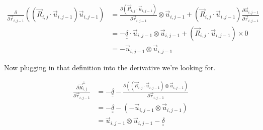 \documentclass{article}
\renewcommand{\ij}{_{i,j}}
\newcommand{\ijj}{_{i,j-1}}
\newcommand{\ijjj}{_{i,j-2}}
\newcommand{\magn}[1]{\left\vert #1 \right\vert }
\renewcommand{\part}[2]{\frac{\partial #1 }{\partial #2}}
\newcommand{\partbig}[2]{\frac{\partial }{\partial #2}\left( #1 \right)}
\newcommand{\ten}[1]{\underline{\underline{#1}}}
\newcommand{\rij}{\vec{r} \ij}
\newcommand{\Rij}{\vec{R} \ij}
\newcommand{\rijj}{\vec{r} \ijj}
\newcommand{\rijjj}{\vec{r} \ijjj}
\newcommand{\uijj}{\vec{u} \ijj}
\begin{document}
\begin{align*}
  \partbig{\left(\vec{R}\ij \cdot \vec{u} \ijj \right) 
  \vec{u} \ijj 
  }{\vec{r}\ijj}
  &= 
  \part{\left(\vec{R}\ij \cdot \vec{u} \ijj \right)}{\vec{r}\ijj} \otimes
  \uijj 
  +
  \left(\vec{R}\ij \cdot \vec{u} \ijj \right)
  \part{\uijj }{\vec{r}\ijj} 
  \\
  &= 
  - \ten{\delta} \cdot \uijj 
  \otimes \uijj 
  + \left(\Rij \cdot \uijj \right) \times 0
  \\
  &= 
  - \uijj \otimes \uijj
\end{align*}

Now plugging in that definition into the derivative we're looking for.

\begin{align*}
  \part{\vec{R}\ij ^ \bot}{\vec{r}\ijj}  &= - \ten{\delta} 
  - \part{\left(\left(\vec{R}\ij \cdot \uijj \right) \otimes 
  \vec{u} \ijj \right)
  }{\vec{r}\ijj} 
  \\
  &= 
  -
  \ten{\delta}
  -
  \left( - \uijj \otimes \uijj \right)
  \\
  &= 
  \boxed{
  \uijj \otimes \uijj 
  -
  \ten{\delta} 
  }
\end{align*}
\end{document}
